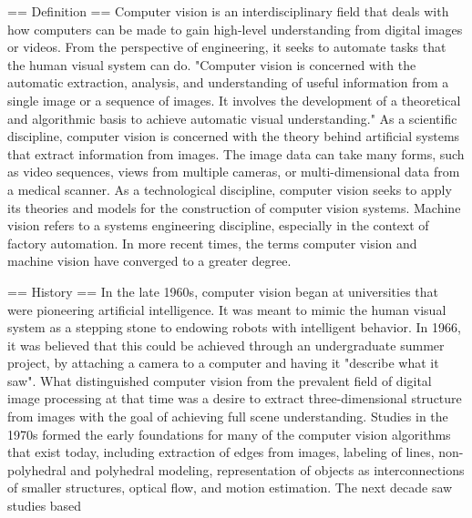 \documentclass[12pt,a4paper]{report}
\begin{document}
== Definition ==
Computer vision is an interdisciplinary field that deals with how computers can be made to gain high-level understanding from digital images or videos. From the perspective of engineering, it seeks to automate tasks that the human visual system can do. "Computer vision is concerned with the automatic extraction, analysis, and understanding of useful information from a single image or a sequence of images. It involves the development of a theoretical and algorithmic basis to achieve automatic visual understanding." As a scientific discipline, computer vision is concerned with the theory behind artificial systems that extract information from images. The image data can take many forms, such as video sequences, views from multiple cameras, or multi-dimensional data from a medical scanner. As a technological discipline, computer vision seeks to apply its theories and models for the construction of computer vision systems. Machine vision refers to a systems engineering discipline, especially in the context of factory automation. In more recent times, the terms computer vision and machine vision have converged to a greater degree.


== History ==
In the late 1960s, computer vision began at universities that were pioneering artificial intelligence. It was meant to mimic the human visual system as a stepping stone to endowing robots with intelligent behavior. In 1966, it was believed that this could be achieved through an undergraduate summer project, by attaching a camera to a computer and having it "describe what it saw".
What distinguished computer vision from the prevalent field of digital image processing at that time was a desire to extract three-dimensional structure from images with the goal of achieving full scene understanding. Studies in the 1970s formed the early foundations for many of the computer vision algorithms that exist today, including extraction of edges from images, labeling of lines, non-polyhedral and polyhedral modeling, representation of objects as interconnections of smaller structures, optical flow, and motion estimation.
The next decade saw studies based
\end{document}
